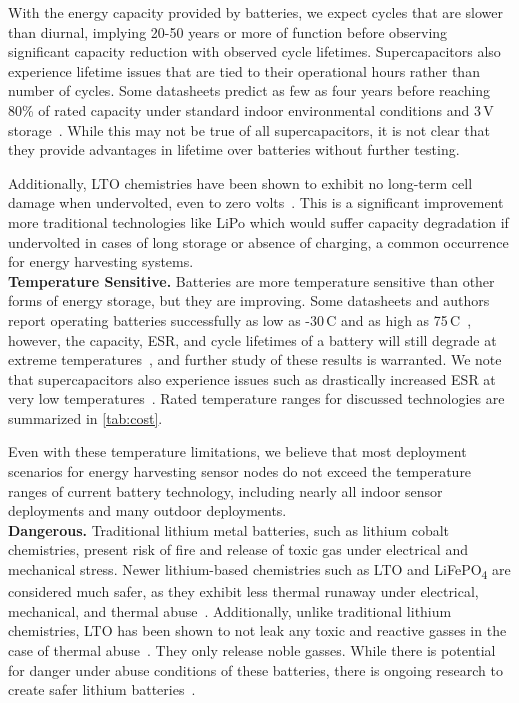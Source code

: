 With the energy capacity provided by batteries, we expect cycles that are
slower than diurnal, implying 20-50 years or more of function before observing
significant capacity reduction with observed cycle lifetimes. Supercapacitors
also experience lifetime issues that are tied to their operational hours rather
than number of cycles.  Some datasheets predict as few as four years before
reaching 80\% of rated capacity under standard indoor environmental conditions
and 3\,V storage~\cite{murataCap}. While this may not be true of all
supercapacitors, it is not clear that they provide advantages in lifetime over
batteries without further testing.

Additionally, LTO chemistries have been shown to exhibit no long-term cell
damage when undervolted, even to zero volts~\cite{brunell2016effect}.
This is a significant improvement more traditional technologies like LiPo which would
suffer capacity degradation if undervolted in cases of long storage or absence
of charging, a common occurrence for energy harvesting systems.
\\



\vspace{-6pt}
\noindent
\textbf{Temperature Sensitive.}
Batteries are
more temperature sensitive
than other forms of energy storage, but they are improving.
Some
datasheets and authors report operating batteries successfully as low as -30\,\textdegree C
and as high as 75\,\textdegree C~\cite{LTODatasheet2, lifepo4Datasheet, chenEvaluation15}, however, the capacity, ESR, and cycle lifetimes of a battery will still
degrade at extreme temperatures~\cite{wangCycle11, swierczynskiInvestigation14},
and further study of these results is warranted. We note that
supercapacitors also experience issues such as drastically increased ESR at very
low temperatures~\cite{murataTech}. Rated temperature ranges for discussed technologies are summarized in \cref{tab:cost}.

Even with these temperature limitations,
we believe that most deployment scenarios for energy harvesting sensor
nodes do not exceed the temperature ranges of current battery technology, including
nearly all indoor sensor deployments and many outdoor deployments.
\\

\vspace{-6pt}
\noindent
\textbf{Dangerous.} Traditional lithium metal batteries, such as
lithium cobalt chemistries, present risk of fire
and release of toxic gas under electrical and mechanical stress. Newer lithium-based
chemistries such as LTO and LiFePO\textsubscript{4} are considered much safer,
as they exhibit less thermal runaway under electrical, mechanical, and thermal
abuse~\cite{belharouakElectrochemistry11, larssonAbuse14}. Additionally,
unlike traditional lithium chemistries, LTO has been shown to not leak
any toxic and reactive gasses in the case of thermal abuse~\cite{belharouakElectrochemistry11}. They only release noble gasses.
While there is potential for danger under abuse conditions of these batteries,
there is ongoing research to create safer lithium batteries~\cite{larssonAbuse14}.

